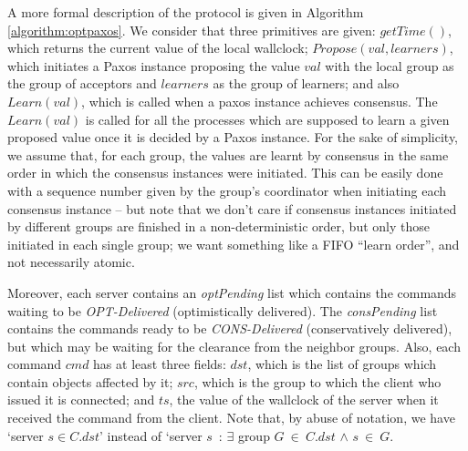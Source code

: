 \documentclass[times, 10pt]{article}
\begin{document}
A more formal description of the protocol is given in Algorithm \ref{algorithm:optpaxos}. We consider that three primitives are given: $getTime()$, which returns the current value of the local wallclock; $Propose(val, learners)$, which initiates a Paxos \cite{paxosref} instance proposing the value $val$ with the local group as the group of acceptors and $learners$ as the group of learners; and also $Learn(val)$, which is called when a paxos instance achieves consensus. The $Learn(val)$ is called for all the processes which are supposed to learn a given proposed value once it is decided by a Paxos instance. For the sake of simplicity, we assume that, for each group, the values are learnt by consensus in the same order in which the consensus instances were initiated. This can be easily done with a sequence number given by the group's coordinator when initiating each consensus instance -- but note that we don't care if consensus instances initiated by different groups are finished in a non-deterministic order, but only those initiated in each single group; we want something like a FIFO ``learn order'', and not necessarily atomic.

Moreover, each server contains an \textit{optPending} list which contains the commands waiting to be \textit{OPT-Delivered} (optimistically delivered). The \mbox{\textit{consPending}} list contains the commands ready to be \textit{CONS-Delivered} (conservatively delivered), but which may be waiting for the clearance from the neighbor groups. Also, each command $cmd$ has at least three fields: $dst$, which is the list of groups which contain objects affected by it; $src$, which is the group to which the client who issued it is connected; and $ts$, the value of the wallclock of the server when it received the command from the client. Note that, by abuse of notation, we have `server $s \in C.dst$' instead of `server $s$~: $\exists$ group $G~\in~C.dst$ $\wedge$ $s~\in~G$.
\end{document}
